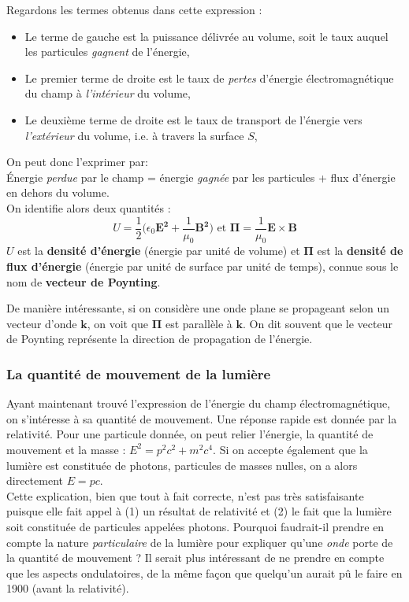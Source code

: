 Regardons les termes obtenus dans cette expression :
\begin{itemize}
\item Le terme de gauche est la puissance délivrée au volume, soit le taux auquel les particules \textit{gagnent} de l'énergie,
\item Le premier terme de droite est le taux de \textit{pertes} d'énergie électromagnétique du champ à \textit{l'intérieur} du volume,
\item Le deuxième terme de droite est le taux de transport de l'énergie vers \textit{l'extérieur} du volume, i.e. à travers la surface $S$,
\end{itemize}
On peut donc l'exprimer par:\\\'Energie \textit{perdue} par le champ = énergie \textit{gagnée} par les particules + flux d'énergie en dehors du volume. \\On identifie alors deux quantités :
\begin{equation}
U=\frac{1}{2}\biggl(\epsilon_0\bm{E^2}+\frac{1}{\mu_0}\bm{B^2}\biggr) \mbox{   et   } \bm{\Pi} = \frac{1}{\mu_0}\bm{E}\times\bm{B}
\label{Def.Poynting}
\end{equation}
$U$ est la \textbf{densité d'énergie} (énergie par unité de volume) et $\bm{\Pi}$ est la \textbf{densité de flux d'énergie} (énergie par unité de surface par unité de temps), connue sous le nom de \textbf{vecteur de Poynting}.

De manière intéressante, si on considère une onde plane se propageant selon un vecteur d'onde $\bm{k}$, on voit que $\bm{\Pi}$ est parallèle à $\bm{k}$. On dit souvent que le vecteur de Poynting représente la direction de propagation de l'énergie.

\subsubsection{La quantité de mouvement de la lumière}
Ayant maintenant trouvé l'expression de l'énergie du champ électromagnétique, on s'intéresse à sa quantité de mouvement. Une réponse rapide est donnée par la relativité. Pour une particule donnée, on peut relier l'énergie, la quantité de mouvement et la masse : $E^2=p^2c^2+m^2c^4$. Si on accepte également que la lumière est constituée de photons, particules de masses nulles, on a alors directement $E = pc$.\\
Cette explication, bien que tout à fait correcte, n'est pas très satisfaisante puisque elle fait appel à (1) un résultat de relativité et (2) le fait que la lumière soit constituée de particules appelées photons. Pourquoi faudrait-il prendre en compte la nature \textit{particulaire} de la lumière pour expliquer qu'une \textit{onde} porte de la quantité de mouvement ? Il serait plus intéressant de ne prendre en compte que les aspects ondulatoires, de la même façon que quelqu'un aurait pû le faire en 1900 (avant la relativité).

